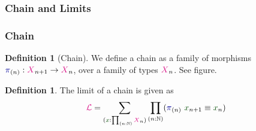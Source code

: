 \documentclass[xelatex,mathserif,serif,notheorems]{beamer} %
\theoremstyle{plain} %
\theoremstyle{definition}
\newtheorem{defn}[thm]{Definition}%
\theoremstyle{remark}
\newcommand*{\term}[1]{\textcolor{green!30!black}{#1}} %
\newcommand*{\type}[1]{\textcolor{magenta!90!black}{#1}}
\newcommand*{\function}[1]{\textcolor{blue!60!black}{\ensuremath{\mathtt{#1}}}}
\newcommand{\setlengths}{
  \setlength{\abovedisplayskip}{4pt}
  \setlength{\belowdisplayskip}{4pt}
  \setlength{\abovedisplayshortskip}{2pt}
  \setlength{\belowdisplayshortskip}{2pt}
}
\begin{document}
\subsubsection{Chain and Limits}
\begin{frame}[fragile]
  \frametitle{Chain}
  \begin{defn}[Chain]\setlengths
    We define a chain as a family of morphisms \(\function{\pi}_{(n)} : \type{X}_{n+1} \rightarrow \type{X}_{n}\), over a family of types \(\type{X}_{n}\). See figure.
  \end{defn}
  \begin{figure}[h]
    \centering
  \end{figure}
  \begin{defn}\setlengths
    The limit of a chain is given as
    \begin{equation}
      \type{\mathcal{L}} = \sum_{(\term{x} : \prod_{(n : \mathbb{N})} \type{X}_n)} \prod_{(n : \mathbb{N})} (\function{\pi}_{(n)}~\term{x}_{n+1} \equiv \term{x}_n)
    \end{equation}
  \end{defn}
\end{frame}
\end{document}
